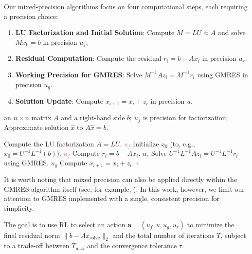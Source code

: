 \documentclass[Afour,sageh,times]{sagej}
\theoremstyle{plain}
\theoremstyle{definition}
\begin{document}
Our mixed-precision algorithms focus on four computational steps, each requiring a precision choice:
\begin{enumerate}
    \item \textbf{LU Factorization and Initial Solution}: Compute $M = LU \approx A$ and solve $M x_0 = b$ in precision $u_f$,
    \item \textbf{Residual Computation}: Compute the residual $r_i = b - Ax_i$ in precision $u_r$.
    \item \textbf{Working Precision for GMRES}: Solve $M^{-1} A z_i = M^{-1} r_i$ using GMRES in precision $u_g$.
    \item \textbf{Solution Update}: Compute $x_{i+1} = x_i + z_i$ in precision $u$.
\end{enumerate}


\begin{algorithm}
\caption{Mixed-precision GMRES-IR}\label{alg:mix_gmres_ir}
\begin{algorithmic}[1]
\Require an $n \times n$ matrix $A$ and a right-hand side $b$; $u_f$ is precision for factorization;
\Ensure Approximate solution $\hat{x}$ to $A\hat{x} = b$.

\State Compute the LU factorization $A = LU$. \hfill \textcolor{tomato}{$u_f$}
\State Initialize $x_0$ (to, e.g., $x_0=U^{-1}L^{-1}(b)$). \hfill \textcolor{tomato}{$u_f$}
    \State Compute $r_i = b - A x_i$. \hfill \textcolor{darkblue}{$u_r$}
    \State Solve $U^{-1}L^{-1}A z_i = U^{-1}L^{-1}r_i$ using GMRES.  \hfill
    \textcolor{darkgreen}{$u_g$}
    \State Compute $x_{i+1} = x_i + z_i$. \hfill \textcolor{orange}{$u$}
\EndFor
\end{algorithmic}
\end{algorithm}


It is worth noting that mixed precision can also be applied directly within the GMRES algorithm itself (see, for example, \cite{vi22}). In this work, however, we limit our attention to GMRES implemented with a single, consistent precision for simplicity.


The goal is to use RL to select an action $\mathbf{a} = (u_f, u, u_g, u_r)$ to minimize the final residual norm $\|b - Ax_{\text{solve}}\|_2$ and the total number of iterations $T$, subject to a trade-off between $T_{\text{max}}$ and the convergence tolerance $\tau$.
\end{document}
